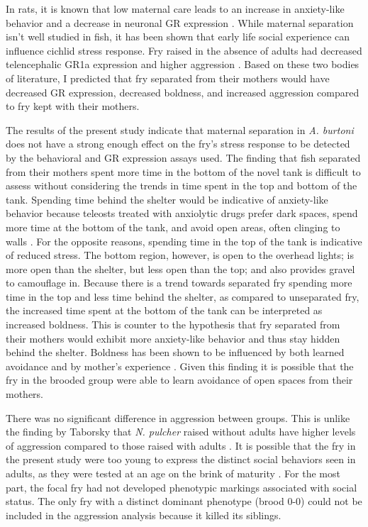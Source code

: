 \documentclass[12pt,twoside]{reedthesis}
\begin{document}
In rats, it is known that low
maternal care leads to an increase in anxiety-like behavior and a decrease
in neuronal GR expression \citep{caldji_maternal_1998}. While maternal
separation isn't well studied in fish, it has been shown that early life
social experience can influence cichlid stress response. Fry raised in the
absence of adults had decreased telencephalic GR1a expression and higher
aggression \citep{nyman_effect_2017, arnold_social_2010}.  Based on these two bodies of literature, I predicted
that fry separated from their mothers would have decreased GR expression,
decreased boldness, and increased aggression compared to fry kept with their mothers. 

The results of the present study indicate that maternal separation in \textit{A.
burtoni} does not have a strong enough effect on the fry's stress response to be
detected by the behavioral and GR expression assays used. The finding that fish separated from their mothers spent more time in the bottom of the novel
tank is difficult to assess without considering the trends in time spent in the
top and bottom of the tank. Spending time behind the shelter would be
indicative of anxiety-like behavior because teleosts treated with anxiolytic
drugs prefer dark spaces, spend more time at the bottom of the tank, and avoid
open areas, often clinging to walls \citep{Gould2011, neumeister_socially_2017,
  ansai_chronic_2016, norton_three-spined_2019, ghisleni_role_2012}. For the opposite reasons, spending time in the top of the
tank is indicative of reduced stress. The bottom region, however, is open to the
overhead lights; is more open than the shelter, but less open than the top; and also provides gravel to
camouflage in. Because there is a trend towards separated fry spending more time in the top
and less time behind the shelter, as compared to unseparated fry, the increased
time spent at the bottom of the tank can be interpreted as increased 
boldness. This is counter to the hypothesis that
fry separated from their mothers would exhibit more anxiety-like behavior and
thus stay hidden behind the shelter. Boldness has been shown to be influenced by
both learned avoidance and by mother's experience \citep{brown_heritable_2007}.
Given this finding it is possible that the fry in
the brooded group were able to learn avoidance of open spaces from their mothers. 

There was no significant difference in aggression between groups. This is unlike the
finding by Taborsky that \textit{N. pulcher} raised without adults have higher levels of
aggression compared to those raised with adults \citep{arnold_social_2010}. It
is possible that the fry in the present study were too young to express the
distinct social behaviors seen in adults, as they were tested at an age on the
brink of maturity \citep{fernald_quantitative_1977}. For the most part, the focal fry had not developed
phenotypic markings associated with social status. The only fry with a distinct
dominant phenotype (brood 0-0) could not be included in
the aggression analysis because it killed its siblings.
\end{document}
